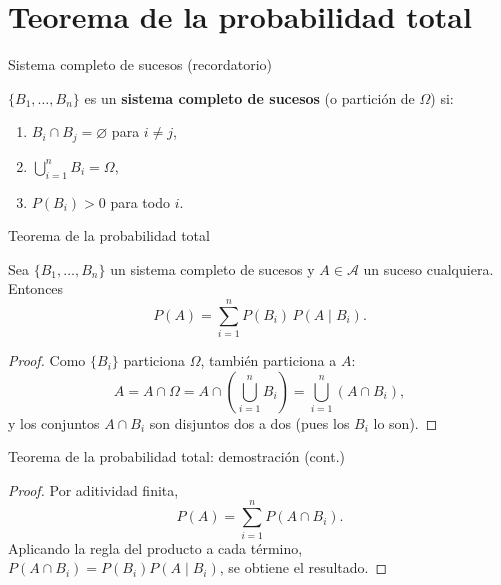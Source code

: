 \documentclass[aspectratio=169,11pt]{beamer}
\begin{document}
\section{Teorema de la probabilidad total}

\begin{frame}{Sistema completo de sucesos (recordatorio)}
\begin{definition}
$\{B_1,\dots,B_n\}$ es un \textbf{sistema completo de sucesos} (o partición de $\Omega$) si:
\begin{enumerate}
\item $B_i \cap B_j = \varnothing$ para $i\neq j$,
\item $\displaystyle\bigcup_{i=1}^n B_i = \Omega$,
\item $P(B_i) > 0$ para todo $i$.
\end{enumerate}
\end{definition}
\centering
{}
\end{frame}

\begin{frame}{Teorema de la probabilidad total}
\begin{theorem}
Sea $\{B_1,\dots,B_n\}$ un sistema completo de sucesos y $A \in \mathcal{A}$ un suceso cualquiera. Entonces
\[
P(A) = \sum_{i=1}^{n} P(B_i)\, P(A\mid B_i).
\]
\end{theorem}
\begin{proof}
Como $\{B_i\}$ particiona $\Omega$, también particiona a $A$:
\[
A = A \cap \Omega = A \cap \left(\bigcup_{i=1}^n B_i\right) = \bigcup_{i=1}^n (A \cap B_i),
\]
y los conjuntos $A\cap B_i$ son disjuntos dos a dos (pues los $B_i$ lo son).
\end{proof}
\end{frame}

\begin{frame}{Teorema de la probabilidad total: demostración (cont.)}
\begin{proof}
Por aditividad finita,
\[
P(A) = \sum_{i=1}^n P(A\cap B_i).
\]
Aplicando la regla del producto a cada término, $P(A\cap B_i) = P(B_i)P(A\mid B_i)$, se obtiene el resultado. \qedhere
\end{proof}
\end{frame}
\end{document}
